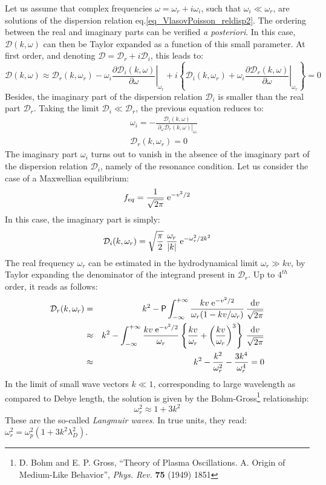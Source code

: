 \documentclass[11pt]{article}
\newcommand{\dd}{\textrm d}
\newcommand{\ee}{\textrm e}
\newcommand{\beq}{\begin{equation}}
\newcommand{\eeq}{\end{equation}}
\newcommand{\beqas}{\begin{eqnarray*}}
\newcommand{\eeqas}{\end{eqnarray*}}
\begin{document}
Let us assume that complex frequencies $\omega=\omega_r+
i\omega_i$, such that $\omega_i \ll \omega_r$, are solutions of
the dispersion relation eq.\eqref{eq_VlasovPoisson_reldisp2}. The ordering between the real and imaginary parts can be verified \emph{a posteriori}. In this
case, $\mathcal{D}(k,\omega)$ can then be Taylor expanded as a
function of this small parameter. At first order, and denoting
$\mathcal{D} = \mathcal{D}_r + i\mathcal{D}_i$, this leads to:
\begin{equation*}
\mathcal{D}(k,\omega) \approx
\mathcal{D}_r(k,\omega_r)
- \omega_i \left.
\frac{\partial \mathcal{D}_i(k,\omega)}{\partial \omega}\right|_{\omega_r}
+ i\left\{\mathcal{D}_i(k,\omega_r)
+ \omega_i \left.
\frac{\partial \mathcal{D}_r(k,\omega)}{\partial \omega}
\right|_{\omega_r}\right\} =0
\end{equation*}
Besides, the imaginary part of the dispersion relation
$\mathcal{D}_i$ is smaller than the real part $\mathcal{D}_r$.
Taking the limit $\mathcal{D}_i \ll \mathcal{D}_r$, the previous
equation reduces to:
\begin{eqnarray*}
	&& \omega_i = -\frac{\mathcal{D}_i(k,\omega)}
	{\;\left.\partial_\omega\mathcal{D}_r(k,\omega)\right|_{\omega_r}} \\
	&& \mathcal{D}_r(k,\omega_r) = 0
\end{eqnarray*}
The imaginary part $\omega_i$ turns out to vanish in the absence of the imaginary part of the
dispersion relation $\mathcal{D}_i$, namely of the resonance
condition. Let us consider the case of a Maxwellian equilibrium:
\beq \label{eq:feq_Maxwell}
f_{eq} = \frac{1}{\sqrt{2\pi}}\; \ee^{-v^2/2}
\eeq
In this case, the imaginary part is simply:
\beq
\mathcal{D}_i(k,\omega_r)
= \sqrt{\frac{\pi}{2}}\; \frac{\omega_r}{|k|}\; \ee^{-\omega_r^2/2k^2}
\eeq
The real frequency $\omega_r$ can be estimated in the hydrodynamical limit $\omega_r\gg kv$, by Taylor expanding the denominator of the integrand present in $\mathcal{D}_r$. Up to $4^{th}$ order, it reads as follows:
\beqas
\mathcal{D}_r(k,\omega_r) &=&
k^2 - \textsf{P} \int_{-\infty}^{+\infty}
\frac{kv\; \ee^{-v^2/2}}{\omega_r(1-kv/\omega_r)} \,\frac{\dd v}{\sqrt{2\pi}} \\
&\approx& k^2 -  \int_{-\infty}^{+\infty} \frac{kv\; \ee^{-v^2/2}}{\omega_r}
\left\{\frac{kv}{\omega_r} + \left(\frac{kv}{\omega_r}\right)^3 \right\} \,\frac{\dd v}{\sqrt{2\pi}} \\
&\approx& k^2 -  \frac{k^2}{\omega_r^2} - \frac{3k^4}{\omega_r^4} = 0
\eeqas
In the limit of small wave vectors $k\ll 1$, corresponding to large wavelength as compared to Debye length, the solution is given by the Bohm-Gross\footnote{D. Bohm and E. P. Gross, ``Theory of Plasma Oscillations. A. Origin of Medium-Like Behavior'', \emph{Phys. Rev.} {\bf 75} (1949) 1851} relationship:
\beq
\label{eq:Bohm_Gross}
\omega_r^2 \approx 1 + 3 k^2
\eeq
These are the so-called \emph{Langmuir waves}. In true units, they read: $\omega_r^2 = \omega_p^2 (1+3k^2\lambda_D^2)$. \\
\end{document}
